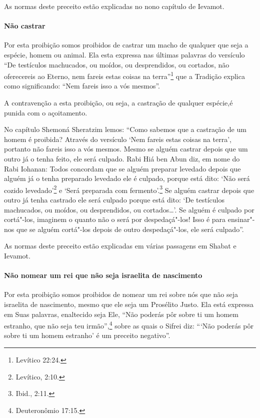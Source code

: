 \begin{multicols}{2}
As normas deste preceito estão explicadas no nono capítulo de Ievamot\starr.

\paragraph{Não castrar}

Por esta proibição somos proibidos de castrar um macho de qualquer que
seja a espécie, homem ou animal. Ela esta expressa nas últimas palavras
do versículo ``De testículos machucados, ou moídos, ou desprendidos, ou
cortados, não oferecereis ao Eterno, nem fareis estas coisas na terra''\footnote{Levítico 22:24.} que a Tradição explica como significando: ``Nem fareis
isso a vós mesmos''.

A contravenção a esta proibição, ou seja, a castração de qualquer
espécie,é punida com o açoitamento.

No capítulo Shemoná Sheratzim\starr{} lemos: ``Como sabemos que a castração
de um homem é proibida? Através do versículo `Nem fareis estas coisas na
terra', portanto não fareis isso a vós mesmos. Mesmo se alguém castrar
depois que um outro já o tenha feito, ele será culpado. Rabi Hiá ben Abun\starr{} diz, em nome do Rabi Iohanan\starr: Todos concordam que se alguém
preparar levedado depois que alguém já o tenha preparado levedado ele é
culpado, porque está dito: `Não será cozido levedado'\footnote{Levítico, 2:10.} e
`Será preparada com fermento'.\footnote{Ibid., 2:11.} Se alguém castrar depois
que outro já tenha castrado ele será culpado porque está dito: `De
testículos machucados, ou moídos, ou desprendidos, ou cortados\ldots{}'. Se
alguém é culpado por cortá"-los, imaginem o quanto não o será por
despedaçá"-los! Isso é para ensinar"-nos que se alguém cortá"-los depois de
outro despedaçá"-los, ele será culpado''.

As normas deste preceito estão explicadas em várias passagens em Shabat
e Ievamot\starr.

\paragraph{Não nomear um rei que não seja israelita de nascimento}

Por esta proibição somos proibidos de nomear um rei sobre nós que não
seja israelita de nascimento, mesmo que ele seja um Prosélito Justo. Ela
está expressa em Suas palavras, enaltecido seja Ele, ``Não poderás pôr
sobre ti um homem estranho, que não seja teu irmão'',\footnote{Deuteronômio
17:15.} sobre as quais o Sifrei\starr{} diz: ```Não poderás pôr sobre ti um homem estranho' é
um preceito negativo''.


\end{multicols}
